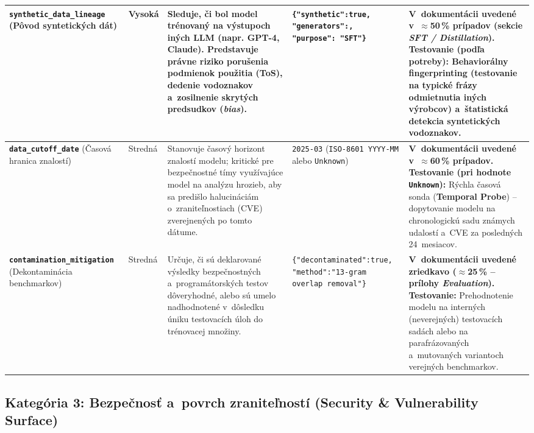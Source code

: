 {\begin{xltabular}{\textwidth}{@{}>{\raggedright\arraybackslash}p{2.6cm}>{\raggedright\arraybackslash}p{1.5cm}>{\raggedright\arraybackslash}X>{\raggedright\arraybackslash}p{3.1cm}>{\raggedright\arraybackslash}X@{}}
\textbf{\texttt{synthetic\_\allowbreak data\_\allowbreak lineage}} \newline (Pôvod syntetických dát) &
Vysoká &
Sleduje, či bol model trénovaný na výstupoch iných LLM (napr. GPT-4, Claude). Predstavuje právne riziko porušenia podmienok použitia (ToS), dedenie vodoznakov a~zosilnenie skrytých predsudkov (\emph{bias}). &
\texttt{\{"synthetic":\allowbreak true, "generators":\allowbreak ["GPT-4"], "purpose": "SFT"\}} &
\textbf{V~dokumentácii uvedené v~$\approx$50\,\% prípadov (sekcie \emph{SFT / Distillation}).} \textbf{Testovanie (podľa potreby):} Behaviorálny fingerprinting (testovanie na typické frázy odmietnutia iných výrobcov) a~štatistická detekcia syntetických vodoznakov. \\
\midrule

\textbf{\texttt{data\_\allowbreak cutoff\_\allowbreak date}} \newline (Časová hranica znalostí) &
Stredná &
Stanovuje časový horizont znalostí modelu; kritické pre bezpečnostné tímy využívajúce model na analýzu hrozieb, aby sa predišlo halucináciám o~zraniteľnostiach (CVE) zverejnených po tomto dátume. &
\texttt{2025-03} \newline (\texttt{ISO-8601 YYYY-MM} alebo \texttt{Unknown}) &
\textbf{V~dokumentácii uvedené v~$\approx$60\,\% prípadov.} \textbf{Testovanie (pri hodnote \texttt{Unknown}):} Rýchla časová sonda (\textbf{Temporal Probe}) -- dopytovanie modelu na chronologickú sadu známych udalostí a~CVE za posledných 24~mesiacov. \\
\midrule

\textbf{\texttt{contamination\_\allowbreak mitigation}} \newline (Dekontaminácia benchmarkov) &
Stredná &
Určuje, či sú deklarované výsledky bezpečnostných a~programátorských testov dôveryhodné, alebo sú umelo nadhodnotené v~dôsledku úniku testovacích úloh do trénovacej množiny. &
\texttt{\{\allowbreak"decontaminated":\allowbreak true, "method":\allowbreak "13-gram overlap removal"\}} &
\textbf{V~dokumentácii uvedené zriedkavo ($\approx$25\,\% -- prílohy \emph{Evaluation}).} \textbf{Testovanie:} Prehodnotenie modelu na interných (neverejných) testovacích sadách alebo na parafrázovaných a~mutovaných variantoch verejných benchmarkov. \\

\end{xltabular}
}

\subsection{Kategória 3: Bezpečnosť a~povrch zraniteľností (Security \& Vulnerability Surface)}
\label{sec:kat-bezpecnost}

